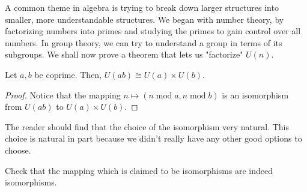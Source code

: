 \documentclass[./main.tex]{subfiles}
\begin{document}
A common theme in algebra is trying to break down larger structures into
smaller, more understandable structures. We began with number theory, by
factorizing numbers into primes and studying the primes to gain control over all
numbers. In group theory, we can try to understand a group in terms of its
subgroups. We shall now prove a theorem that lets us "factorize" $U(n)$. 
\begin{theorem}[Structure of $U(n)$]
    Let $a, b$ be coprime. Then, $U(ab) \cong U(a) \times U(b)$.
\end{theorem}
\begin{proof}
    Notice that the mapping $n \mapsto (n \operatorname{mod} a, n
    \operatorname{mod} b)$ is an isomorphism from $U(ab)$ to $U(a) \times U(b)$.
\end{proof}
The reader should find that the choice of the isomorphism very natural. This
choice is natural in part because we didn't really have any other good options
to choose. 
\begin{exercise}
    Check that the mapping which is claimed to be isomorphisms are indeed isomorphisms.
\end{exercise}
\end{document}
